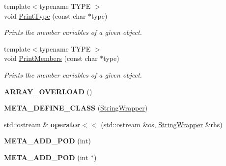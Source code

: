 \begin{DoxyCompactItemize}
\item 
\hypertarget{namespaceDCEngine_ad026ffe481e698f2af8aee4f0810c5b3}{{\footnotesize template$<$typename T\-Y\-P\-E $>$ }\\void \hyperlink{namespaceDCEngine_ad026ffe481e698f2af8aee4f0810c5b3}{Print\-Type} (const char $\ast$type)}\label{namespaceDCEngine_ad026ffe481e698f2af8aee4f0810c5b3}

\begin{DoxyCompactList}\small\item\em Prints the member variables of a given object. \end{DoxyCompactList}\item 
\hypertarget{namespaceDCEngine_a10e521135488a4132ebc8e49b04bbc0a}{{\footnotesize template$<$typename T\-Y\-P\-E $>$ }\\void \hyperlink{namespaceDCEngine_a10e521135488a4132ebc8e49b04bbc0a}{Print\-Members} (const char $\ast$type)}\label{namespaceDCEngine_a10e521135488a4132ebc8e49b04bbc0a}

\begin{DoxyCompactList}\small\item\em Prints the member variables of a given object. \end{DoxyCompactList}\item 
\hypertarget{namespaceDCEngine_a957bc3c9baf7dade57667227593467fa}{{\bfseries A\-R\-R\-A\-Y\-\_\-\-O\-V\-E\-R\-L\-O\-A\-D} ()}\label{namespaceDCEngine_a957bc3c9baf7dade57667227593467fa}

\item 
\hypertarget{namespaceDCEngine_a9dfe18fc30da4523bf3c5af435a50a4a}{{\bfseries M\-E\-T\-A\-\_\-\-D\-E\-F\-I\-N\-E\-\_\-\-C\-L\-A\-S\-S} (\hyperlink{classDCEngine_1_1StringWrapper}{String\-Wrapper})}\label{namespaceDCEngine_a9dfe18fc30da4523bf3c5af435a50a4a}

\item 
\hypertarget{namespaceDCEngine_a0fa07cbb74a2efb257af0b45de8c4875}{std\-::ostream \& {\bfseries operator$<$$<$} (std\-::ostream \&os, \hyperlink{classDCEngine_1_1StringWrapper}{String\-Wrapper} \&rhs)}\label{namespaceDCEngine_a0fa07cbb74a2efb257af0b45de8c4875}

\item 
\hypertarget{namespaceDCEngine_a9ef3c34986f8395e44486e2b16bdc6c4}{{\bfseries M\-E\-T\-A\-\_\-\-A\-D\-D\-\_\-\-P\-O\-D} (int)}\label{namespaceDCEngine_a9ef3c34986f8395e44486e2b16bdc6c4}

\item 
\hypertarget{namespaceDCEngine_af7cf15665941cc76553314d101eca3f6}{{\bfseries M\-E\-T\-A\-\_\-\-A\-D\-D\-\_\-\-P\-O\-D} (int $\ast$)}\label{namespaceDCEngine_af7cf15665941cc76553314d101eca3f6}


\end{DoxyCompactItemize}
